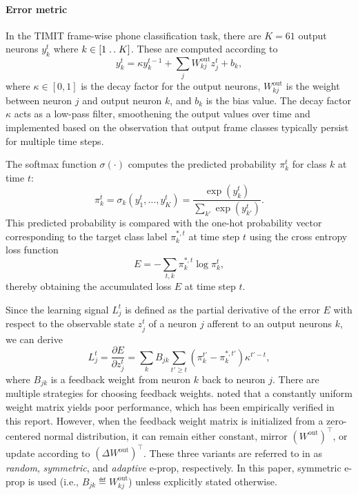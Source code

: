             \paragraph{Error metric}
            In the TIMIT frame-wise phone classification task, there are $K=61$ output neurons $y^t_k$ where $k \in [1\mathrel{{.}\,{.}}\nobreak K]$.
            These are computed according to
            \begin{equation}\label{eq:bellec_y}
            y^t_k = \kappa y^{t-1}_k + \sum_jW^\text{out}_{kj}z^t_j + b_k,
            \end{equation}
            where $\kappa \in [0, 1]$ is the decay factor for the output neurons, $W^\text{out}_{kj}$ is the weight between neuron $j$ and output neuron $k$, and $b_k$ is the bias value.
            The decay factor $\kappa$ acts as a low-pass filter, smoothening the output values over time and implemented based on the observation that output frame classes typically persist for multiple time steps.

            The softmax function $\sigma(\cdot)$ computes the predicted probability $\pi^t_k$ for class $k$ at time $t$:
            \begin{equation}
            \pi^t_k = \sigma_k\left(y^t_1,\ldots,y^t_K\right) = \frac{\exp\left(y^t_k\right)}{\sum_{k'}\exp\left(y^t_{k'}\right)}.
            \end{equation}
            This predicted probability is compared with the one-hot probability vector corresponding to the target class label $\pi^{*,t}_k$ at time step $t$ using the cross entropy loss function
            \begin{equation}
            E = -\sum_{t,k}\pi^{*,t}_k\log\pi^t_k,
            \end{equation}
            thereby obtaining the accumulated loss $E$ at time step $t$.

            Since the learning signal $L^t_j$ is defined as the partial derivative of the error $E$ with respect to the observable state $z_j^t$ of a neuron $j$ afferent to an output neurons $k$, we can derive
            \begin{equation}\label{eq:learningsignal_after_output}
            L^t_j = \frac{\partial E}{\partial z^t_j} = \sum_kB_{jk}\sum_{t'\geq t}\left(\pi^{t'}_k - \pi^{*,t'}_k\right)\kappa^{t'-t},
            \end{equation}
            where $B_{jk}$ is a feedback weight from neuron $k$ back to neuron $j$.
            There are multiple strategies for choosing feedback weights.
            \citet{bellec2020solution} noted that a constantly uniform weight matrix yields poor performance, which has been empirically verified in this report.
            However, when the feedback weight matrix is initialized from a zero-centered normal distribution, it can remain either constant, mirror $(W^\text{out})^\top$, or update according to $(\Delta W^\text{out})^\top$.
            These three variants are referred to in \citet{bellec2020solution} as \emph{random}, \emph{symmetric}, and \emph{adaptive} e-prop, respectively.
            In this paper, symmetric e-prop is used (i.e., $B_{jk} \eqdef W^\text{out}_{kj}$) unless explicitly stated otherwise.

